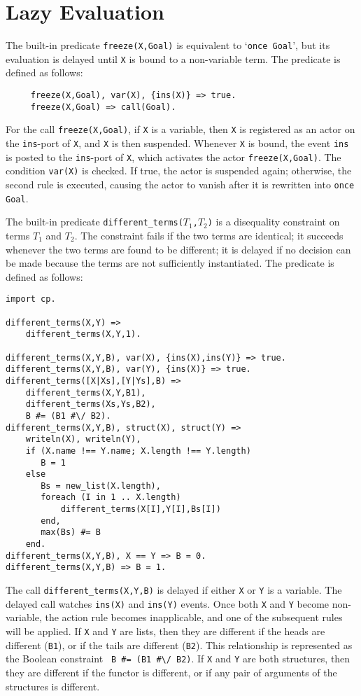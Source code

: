 \section{Lazy Evaluation}
The built-in predicate \texttt{freeze(X,Goal)} is equivalent to `\texttt{once Goal}', but its evaluation is delayed until \texttt{X} is bound to a non-variable term. The predicate is defined as follows:
\begin{verbatim}
     freeze(X,Goal), var(X), {ins(X)} => true.
     freeze(X,Goal) => call(Goal).
\end{verbatim}
For the call \texttt{freeze(X,Goal)}, if  \texttt{X} is a variable, then \texttt{X} is registered as an actor on the \texttt{ins}-port of \texttt{X}, and \texttt{X} is then suspended. Whenever \texttt{X} is bound, the event \texttt{ins} is posted to the \texttt{ins}-port of \texttt{X}, which activates the actor \texttt{freeze(X,Goal)}. The condition \texttt{var(X)} is checked. If true, the actor is suspended again; otherwise, the second rule is executed, causing the actor to vanish after it is rewritten into \texttt{once Goal}.

The built-in predicate \texttt{different\_terms($T_1$,$T_2$)} is a disequality constraint on terms $T_1$ and $T_2$. The constraint fails if the two terms are identical; it succeeds whenever the two terms are found to be different; it is delayed if no decision can be made because the terms are not sufficiently instantiated. The predicate is defined as follows:
\begin{verbatim}
import cp.

different_terms(X,Y) =>
    different_terms(X,Y,1).

different_terms(X,Y,B), var(X), {ins(X),ins(Y)} => true.
different_terms(X,Y,B), var(Y), {ins(X)} => true.
different_terms([X|Xs],[Y|Ys],B) =>
    different_terms(X,Y,B1),
    different_terms(Xs,Ys,B2),
    B #= (B1 #\/ B2).
different_terms(X,Y,B), struct(X), struct(Y) =>
    writeln(X), writeln(Y),											  
    if (X.name !== Y.name; X.length !== Y.length)
       B = 1
    else
       Bs = new_list(X.length),
       foreach (I in 1 .. X.length)
           different_terms(X[I],Y[I],Bs[I])
       end,
       max(Bs) #= B
    end.
different_terms(X,Y,B), X == Y => B = 0.
different_terms(X,Y,B) => B = 1.
\end{verbatim}
The call \texttt{different\_terms(X,Y,B)} is delayed if either \texttt{X} or \texttt{Y} is a variable. The delayed call watches \texttt{ins(X)} and  \texttt{ins(Y)} events. Once both \texttt{X} and \texttt{Y} become non-variable, the action rule becomes inapplicable, and one of the subsequent rules will be applied. If \texttt{X} and \texttt{Y} are lists, then they are different if the heads are different (\verb+B1+), or if the tails are different (\verb+B2+).  This relationship is represented as the Boolean constraint \verb+ B #= (B1 #\/ B2)+. If \texttt{X} and \texttt{Y} are both structures, then they are different if the functor is different, or if any pair of arguments of the structures is different.


